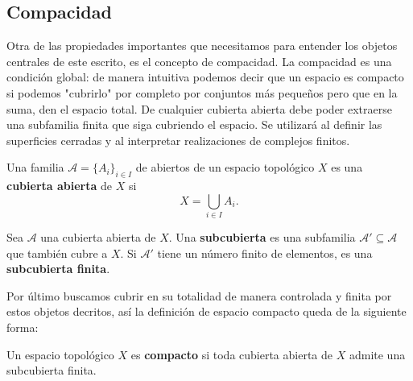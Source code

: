\subsection{Compacidad}
Otra de las propiedades importantes que necesitamos para entender los objetos centrales de este escrito, es el concepto de compacidad.  
La compacidad es una condición global: de manera intuitiva podemos decir que un espacio es compacto si podemos "cubrirlo" por completo por conjuntos más pequeños pero que en la suma, den el espacio total. De cualquier cubierta abierta debe poder extraerse una subfamilia finita que siga cubriendo el espacio. Se utilizará al definir las superficies cerradas y al interpretar realizaciones de complejos finitos.

\begin{definition}
\label{def:cubierta-abierta}
Una familia $\mathcal{A}=\{A_i\}_{i\in I}$ de abiertos de un espacio topológico $X$ es una \textbf{cubierta abierta} de $X$ si
\[
X=\bigcup_{i\in I}A_i.
\]
\end{definition}

\begin{definition}
\label{def:subcubierta-finita}
Sea $\mathcal{A}$ una cubierta abierta de $X$. Una \textbf{subcubierta} es una subfamilia $\mathcal{A}'\subseteq\mathcal{A}$ que también cubre a $X$. Si $\mathcal{A}'$ tiene un número finito de elementos, es una \textbf{subcubierta finita}.
\end{definition}

Por último buscamos cubrir en su totalidad de manera controlada y finita por estos objetos decritos, así la definición de espacio compacto queda de la siguiente forma:
\begin{definition}
\label{def:espacio-compacto}
Un espacio topológico $X$ es \textbf{compacto} si toda cubierta abierta de $X$ admite una subcubierta finita.
\end{definition}

